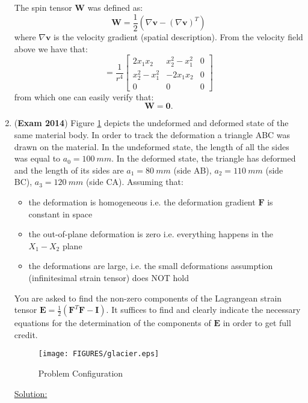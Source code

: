 \documentclass{article}
\newcommand{\ee}{\end{equation}}
\newcommand{\be}{\begin{equation}}
\newcommand{\bi}{\begin{itemize}}
\newcommand{\ei}{\end{itemize}}
\newcommand{\bs}{\boldsymbol}
\begin{document}
\begin{enumerate}
The spin tensor $\bs{W}$ was defined as:
\be
\bs{W}=\frac{1}{2}( \nabla \bs{v}-(\nabla \bs{v})^T)
\ee
where $\nabla \bs{v}$ is the velocity gradient (spatial description).
From the velocity field above we have that:
\be
[\bs{v}]=\frac{1}{r^4}\left[\begin{array}{lll}   2x_1x_2 & x_2^2-x_1^2 & 0 \\
                             x_2^2-x_1^2 &-2x_1x_2 & 0 \\ 0 & 0 & 0
                            \end{array}\right]
\ee
from which one can easily verify that:
\be
\bs{W}=\bs{0}.
\ee

\item (\textbf{Exam 2014})  Figure \ref{fig:glacier} 
depicts the undeformed and deformed state of the same material body. In order to track the deformation a triangle ABC was drawn on the material. In the undeformed state, the length of all the sides was equal to $a_0=100~mm$. In the deformed state, the triangle has deformed and the length of its sides are $a_1=80~mm$ (side AB), $a_2=110~mm$ (side BC), $a_3=120~mm$ (side CA).
Assuming that:
\bi
\item the deformation is homogeneous i.e. the deformation gradient $\bs{F}$ is constant in space
\item the out-of-plane deformation is zero i.e. everything happens in the $X_1-X_2$ plane
\item the deformations are large, i.e. the small deformations assumption (infinitesimal strain tensor) does NOT hold
\ei
You are asked to find the non-zero components of the Lagrangean strain tensor $\bs{E}=\frac{1}{2}(\bs{F}^T \bs{F}-\bs{I})$.  It suffices to find and clearly indicate the necessary equations for the determination of the components of $\bs{E}$ in order to get full credit.

\begin{figure}[!h]

\centering
  \texttt{[image: FIGURES/glacier.eps]}
 \caption{Problem Configuration}
 \label{fig:glacier}
\end{figure}

\underline{Solution:}


\end{enumerate}
\end{document}
